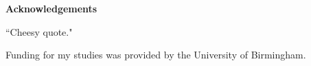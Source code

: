 \begin{flushleft}
	{\LARGE\textbf{Acknowledgements}\\}
\end{flushleft}

\begin{flushright}
``Cheesy quote."
\end{flushright}

Funding for my studies was provided by the University of Birmingham.